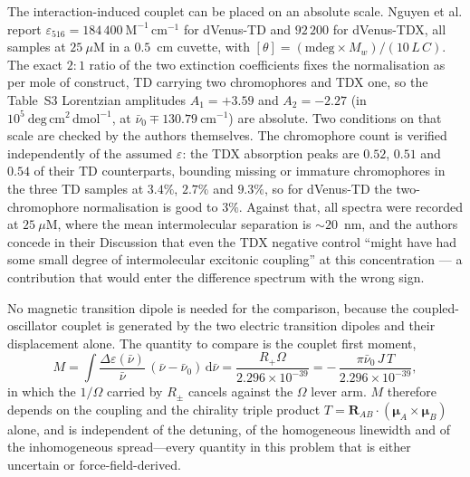 \documentclass[journal=jpcbfk, manuscript=article, layout=twocolumn, doi=true]{achemso}
\begin{document}
The interaction-induced couplet can be placed on an absolute scale. Nguyen
et al.\cite{nguyen2025anomalous} report
$\varepsilon_{516} = 184\,400~\mathrm{M^{-1}\,cm^{-1}}$ for dVenus-TD and
$92\,200$ for dVenus-TDX, all samples at $25~\mu\mathrm{M}$ in a $0.5$~cm
cuvette, with $[\theta] = (\mathrm{mdeg}\times M_{w})/(10\,L\,C)$. The exact
$2\!:\!1$ ratio of the two extinction coefficients fixes the normalisation as
per mole of construct, TD carrying two chromophores and TDX one, so the
Table~S3 Lorentzian amplitudes $A_{1} = +3.59$ and $A_{2} = -2.27$ (in
$10^{5}~\mathrm{deg\,cm^{2}\,dmol^{-1}}$, at $\bar\nu_{0}\mp130.79~
\mathrm{cm^{-1}}$) are absolute. Two conditions on that scale are checked by
the authors themselves. The chromophore count is verified independently of the
assumed $\varepsilon$: the TDX absorption peaks are $0.52$, $0.51$ and $0.54$
of their TD counterparts, bounding missing or immature chromophores in the
three TD samples at $3.4\%$, $2.7\%$ and $9.3\%$, so for dVenus-TD the
two-chromophore normalisation is good to $3\%$. Against that, all spectra were
recorded at $25~\mu\mathrm{M}$, where the mean intermolecular separation is
$\sim\!20$~nm, and the authors concede in their Discussion that even the TDX
negative control ``might have had some small degree of intermolecular excitonic
coupling'' at this concentration --- a contribution that would enter the
difference spectrum with the wrong sign.

No magnetic transition dipole is needed for the comparison, because the
coupled-oscillator couplet is generated by the two electric transition dipoles
and their displacement alone. The quantity to compare is the couplet first
moment,
\begin{equation}
M = \int \frac{\Delta\varepsilon(\bar\nu)}{\bar\nu}\,
        (\bar\nu-\bar\nu_{0})\,\mathrm{d}\bar\nu
  = \frac{R_{+}\Omega}{2.296\times10^{-39}}
  = -\,\frac{\pi\bar\nu_{0}\,J\,T}{2.296\times10^{-39}} ,
\label{eq:firstmomentcd}
\end{equation}
in which the $1/\Omega$ carried by $R_{\pm}$ cancels against the $\Omega$ lever
arm. $M$ therefore depends on the coupling and the chirality triple product
$T = \mathbf{R}_{AB}\cdot(\bm\mu_{A}\times\bm\mu_{B})$ alone, and is
independent of the detuning, of the homogeneous linewidth and of the
inhomogeneous spread---every quantity in this problem that is either uncertain
or force-field-derived.
\end{document}
